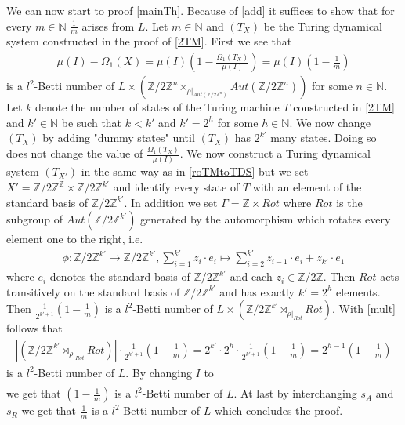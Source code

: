 \documentclass[12pt,a4paper]{scrartcl}
\numberwithin{equation}{section}
\newcommand{\Z}{\mathbb{Z}} %
\newcommand{\N}{\mathbb{N}} %
\newcommand{\2}{\mathbb{Z} / 2 \mathbb{Z}}
\newcommand{\1}{\overline{1}}
\newcommand{\0}{\overline{0}}
\begin{document}
We can now start to proof \ref{mainTh}. Because of \ref{add} it suffices to show that for every $m \in \N$ $\frac{1}{m}$ arises from $L$. Let $m \in \N$  and $(T_X)$ be the Turing dynamical system constructed in the proof of \ref{2TM}. First we see that
\begin{align*}
	\mu (I) - \Omega_1(X) = \mu (I) (1 - \frac{\Omega_1(T_X)}{\mu(I)}) = \mu (I) (1 - \frac{1}{m})
\end{align*}
is a $l^2$-Betti number of $L \times (\2^n \rtimes_{\rho|_{Aut(\2^n)}} Aut(\2^n))$ for some $n \in \N$. Let $k$ denote the number of states of the Turing machine $T$ constructed in \ref{2TM} and $k' \in \N$ be such that $k < k'$ and $k' = 2^{h}$ for some $h \in \N$. We now change $(T_X)$ by adding "dummy states" until $(T_X)$ has $2^{k'}$ many states. Doing so does not change the value of $\frac{\Omega_1(T_X)}{\mu(I)}$. We now construct a Turing dynamical system $(T_{X'})$ in the same way as in \ref{roTMtoTDS} but we set $X' = \2^\Z \times \2^{k'}$ and identify every state of $T$ with an element of the standard basis of $\2^{k'}$. In addition we set $\Gamma = \Z \times Rot$ where $Rot$ is the subgroup of $Aut(\2^{k'})$ generated by the automorphism which rotates every element one to the right, i.e.
\begin{align*}
	\phi : \2^{k'} \to \2^{k'}, \sum_{i =1}^{k'}z_i \cdot e_i \mapsto \sum_{i =2}^{k'}z_{i - 1} \cdot e_i + z_{k'} \cdot e_1
\end{align*}
where $e_i$ denotes the standard basis of $\2^{k'}$ and each $z_i \in \2$. Then $Rot$ acts transitively on the standard basis of $\2^{k'}$ and has exactly $k' = 2^{h}$ elements. Then $\frac{1}{2^{k' + 1}} (1 - \frac{1}{m})$ is a $l^2$-Betti number of $L \times (\2^{k'} \rtimes_{\rho|_{Rot}} Rot)$. With \ref{mult} follows that 
\begin{align*}
	|(\2^{k'} \rtimes_{\rho|_{Rot}} Rot)| \cdot \frac{1}{2^{k' + 1}} (1 - \frac{1}{m}) = 2^{k'} \cdot 2^h \cdot \frac{1}{2^{k' + 1}} (1 - \frac{1}{m}) = 2^{h -1} (1 - \frac{1}{m})
\end{align*}
is a $l^2$-Betti number of $L$. By changing $I$ to
\begin{align*}
	[\1^{h-1} \underline{\1}][s_I]
\end{align*}
we get that $(1 - \frac{1}{m})$ is a $l^2$-Betti number of $L$. At last by interchanging $s_A$ and $s_R$ we get that $\frac{1}{m}$ is a $l^2$-Betti number of $L$ which concludes the proof.
  \newpage
\end{document}
